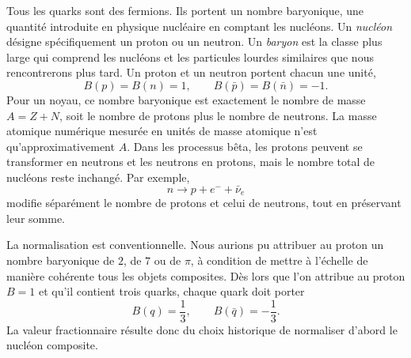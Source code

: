 Tous les quarks sont des fermions. Ils portent un nombre baryonique, une quantité introduite en physique nucléaire en comptant les nucléons. Un \emph{nucléon} désigne spécifiquement un proton ou un neutron. Un \emph{baryon} est la classe plus large qui comprend les nucléons et les particules lourdes similaires que nous rencontrerons plus tard. Un proton et un neutron portent chacun une unité,
\begin{equation}
B(p)=B(n)=1,
\qquad
B(\bar p)=B(\bar n)=-1.
\end{equation}
Pour un noyau, ce nombre baryonique est exactement le nombre de masse \(A=Z+N\), soit le nombre de protons plus le nombre de neutrons. La masse atomique numérique mesurée en unités de masse atomique n’est qu’approximativement \(A\). Dans les processus bêta, les protons peuvent se transformer en neutrons et les neutrons en protons, mais le nombre total de nucléons reste inchangé. Par exemple,
\begin{equation}
n\longrightarrow p+e^-+\bar\nu_e
\end{equation}
modifie séparément le nombre de protons et celui de neutrons, tout en préservant leur somme.

\begin{classroomqa}
\end{classroomqa}

La normalisation est conventionnelle. Nous aurions pu attribuer au proton un nombre baryonique de \(2\), de \(7\) ou de \(\pi\), à condition de mettre à l’échelle de manière cohérente tous les objets composites. Dès lors que l’on attribue au proton \(B=1\) et qu’il contient trois quarks, chaque quark doit porter
\begin{equation}
B(q)=\frac13,
\qquad
B(\bar q)=-\frac13.
\end{equation}
La valeur fractionnaire résulte donc du choix historique de normaliser d’abord le nucléon composite.

\begin{classroomqa}
\end{classroomqa}

